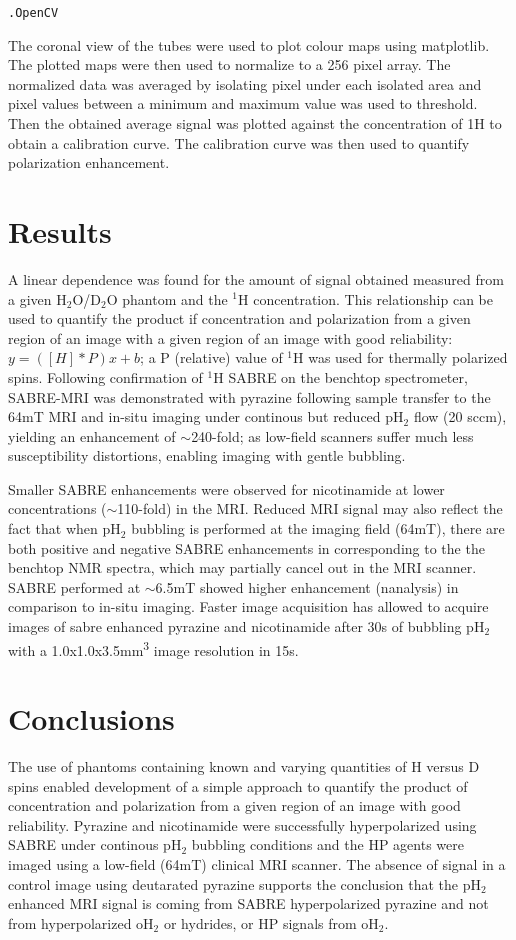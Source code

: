 \documentclass[final,3p,times,twocolumn]{elsarticle}
\begin{document}
\texttt{.OpenCV} 


The coronal view of the tubes were used to plot colour maps using matplotlib. The plotted maps were then used to normalize to a 256 pixel array. The normalized data was averaged by isolating pixel under each isolated area and pixel values between a minimum and maximum value was used to threshold. Then the obtained average signal was plotted against the concentration of 1H to obtain a calibration curve. 
The calibration curve was then used to quantify polarization enhancement. 

\section{Results}
A linear dependence was found for the amount of signal obtained measured from a given H$_{\mathrm{2}}$O/D$_{\mathrm{2}}$O phantom and the $^{\mathrm{1}}$H concentration. This relationship can be used to quantify the product if concentration and polarization from a given region of an image with a given region of an image with good reliability: $y=( [H]*P )x+b$; a P (relative) value of $^{\mathrm{1}}$H was used for thermally polarized spins. Following confirmation of $^{\mathrm{1}}$H SABRE on the benchtop spectrometer, SABRE-MRI was demonstrated with pyrazine following sample transfer to the 64mT MRI and in-situ imaging under continous but reduced pH$_{\mathrm{2}}$ flow (20 sccm), yielding an enhancement of $\sim$240-fold; as low-field scanners suffer much less susceptibility distortions, enabling imaging with gentle bubbling. 
\par Smaller SABRE enhancements were observed for nicotinamide at lower concentrations ($\sim$110-fold) in the MRI. Reduced MRI signal may also reflect the fact that when pH$_{\mathrm{2}}$ bubbling is performed at the imaging field (64mT), there are both positive and negative SABRE enhancements in corresponding to the the benchtop NMR spectra, which may partially cancel out in the MRI scanner. 
SABRE performed at $\sim$6.5mT showed higher enhancement (nanalysis) in comparison to in-situ imaging. Faster image acquisition has allowed to acquire images of sabre enhanced pyrazine and nicotinamide after 30s of bubbling pH$_{\mathrm{2}}$ with a 1.0x1.0x3.5mm\textsuperscript{3} image resolution in 15s.
\section{Conclusions}
The use of phantoms containing known and varying quantities of H versus D spins enabled development of a simple approach to quantify the product of concentration and polarization from a given region of an image with good reliability. Pyrazine and nicotinamide were successfully hyperpolarized using SABRE under continous pH$_{\mathrm{2}}$ bubbling conditions and the HP agents were imaged using a low-field (64mT) clinical MRI scanner. 
The absence of signal in a control image using deutarated pyrazine supports the conclusion that the pH$_{\mathrm{2}}$ enhanced MRI signal is coming from SABRE hyperpolarized pyrazine and not from hyperpolarized oH$_{\mathrm{2}}$ or hydrides, or HP signals from oH$_{\mathrm{2}}$.
\end{document}
